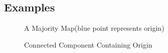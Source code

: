 \subsection{Examples}
\begin{figure}[h]
\begin{center}
\caption{\label{fig:Connected component} A Majority Map(blue point represents origin)}
\end{center}
\end{figure}

\begin{figure}[h]
\begin{center}
\caption{\label{fig:Connected Component} Connected Component Containing Origin}
\end{center}
\end{figure}



